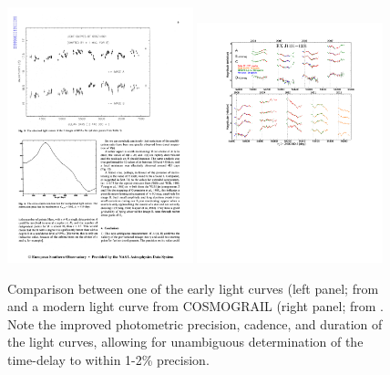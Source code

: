\begin{figure}
\includegraphics[width=0.48\textwidth]{figures/Vanderriest89_fig5.pdf}
\includegraphics[width=0.48\textwidth]{figures/Tewes13-fig4.pdf}
\caption{Comparison between one of the early light curves (left panel; from \cite{Van89} and a modern light curve from COSMOGRAIL (right panel; from \cite{Tew++13}. Note the improved photometric precision, cadence, and duration of the light curves, allowing for unambiguous determination of the time-delay to within 1-2\% precision.}
\label{fig:oldvsmoderndt}
\end{figure}

